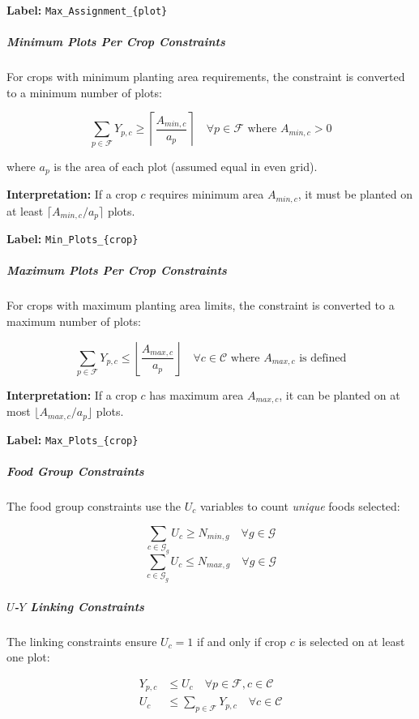 \documentclass{oqireport}
\begin{document}
\textbf{Label:} \texttt{Max\_Assignment\_\{plot\}}

\subparagraph{Minimum Plots Per Crop Constraints}

For crops with minimum planting area requirements, the constraint is converted to a minimum number of plots:

$$\sum_{p \in \mathcal{F}} Y_{p,c} \geq \left\lceil \frac{A_{min,c}}{a_p} \right\rceil \quad \forall p \in \mathcal{F} \text{ where } A_{min,c} > 0$$

where $a_p$ is the area of each plot (assumed equal in even grid).



\textbf{Interpretation:} If a crop $c$ requires minimum area $A_{min,c}$, it must be planted on at least $\lceil A_{min,c} / a_p \rceil$ plots.

\textbf{Label:} \texttt{Min\_Plots\_\{crop\}}

\subparagraph{Maximum Plots Per Crop Constraints}

For crops with maximum planting area limits, the constraint is converted to a maximum number of plots:

$$\sum_{p \in \mathcal{F}} Y_{p,c} \leq \left\lfloor \frac{A_{max,c}}{a_p} \right\rfloor \quad \forall c \in \mathcal{C} \text{ where } A_{max,c} \text{ is defined}$$



\textbf{Interpretation:} If a crop $c$ has maximum area $A_{max,c}$, it can be planted on at most $\lfloor A_{max,c} / a_p \rfloor$ plots.


\textbf{Label:} \texttt{Max\_Plots\_\{crop\}}




\subparagraph{Food Group Constraints}

The food group constraints use the $U_c$ variables to count \textit{unique} foods selected:

$$\sum_{c \in \mathcal{G}_g} U_c \geq N_{min,g} \quad \forall g \in \mathcal{G}$$
$$\sum_{c \in \mathcal{G}_g} U_c \leq N_{max,g} \quad \forall g \in \mathcal{G}$$

\subparagraph{$U$-$Y$ Linking Constraints}

The linking constraints ensure $U_c = 1$ if and only if crop $c$ is selected on at least one plot:

\begin{align}
Y_{p,c} &\leq U_c \quad \forall p \in \mathcal{F}, c \in \mathcal{C}\\
U_c &\leq \sum_{p \in \mathcal{F}} Y_{p,c} \quad \forall c \in \mathcal{C}
\end{align}
\end{document}

